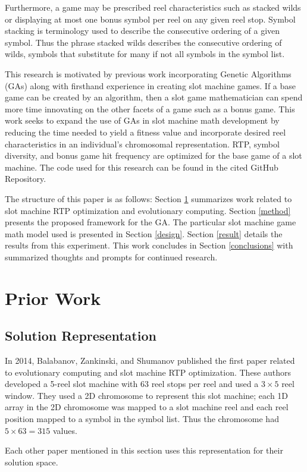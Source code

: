 \documentclass[conference]{IEEEtran}
\begin{document}
\par
Furthermore, a game may be prescribed reel characteristics such as stacked wilds or displaying at most one bonus symbol per reel on any given reel stop.
Symbol stacking is terminology used to describe the consecutive ordering of a given symbol.
Thus the phrase stacked wilds describes the consecutive ordering of wilds, symbols that substitute for many if not all symbols in the symbol list.
\par
This research is motivated by previous work incorporating Genetic Algorithms (GAs) along with firsthand experience in creating slot machine games.
If a base game can be created by an algorithm, then a slot game mathematician can spend more time innovating on the other facets of a game such as a bonus game.
This work seeks to expand the use of GAs in slot machine math development by reducing the time needed to yield a fitness value and incorporate desired reel characteristics in an individual's chromosomal representation.
RTP, symbol diversity, and bonus game hit frequency are optimized for the base game of a slot machine.
The code used for this research can be found in the cited GitHub Repository\cite{ReelCharacteristicsRepo}.
\par
The structure of this paper is as follows: Section \ref{prior} summarizes work related to slot machine RTP optimization and evolutionary computing. Section \ref{method} presents the proposed framework for the GA. The particular slot machine game math model used is presented in Section \ref{design}. Section \ref{result} details the results from this experiment. This work concludes in Section \ref{conclusions} with summarized thoughts and prompts for continued research.
\section{Prior Work}
\label{prior}
\subsection{Solution Representation}
In 2014, Balabanov, Zankinski, and Shumanov published the first paper related to evolutionary computing and slot machine RTP optimization\cite{balabanov2015slot}.
These authors developed a 5-reel slot machine with 63 reel stops per reel and used a $3\times 5$ reel window.
They used a 2D chromosome to represent this slot machine; each 1D array in the 2D chromosome was mapped to a slot machine reel and each reel position mapped to a symbol in the symbol list. Thus the chromosome had $5 \times 63 = 315$ values.
\par
Each other paper mentioned in this section uses this representation for their solution space.
\end{document}
